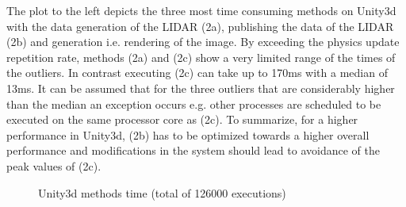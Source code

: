 	The plot to the left depicts the three most time consuming methods on Unity3d with the data generation of the \ac{LIDAR} (2a), publishing the data of the \ac{LIDAR} (2b) and generation i.e. rendering of the image. By exceeding the physics update repetition rate, methods (2a) and (2c) show a very limited range of the times of the outliers. In contrast executing (2c) can take up to 170ms with a median of 13ms. It can be assumed that for the three outliers that are considerably higher than the median an exception occurs e.g. other processes are scheduled to be executed on the same processor core as (2c). To summarize, for a higher performance in Unity3d, (2b) has to be optimized towards a higher overall performance and modifications in the system should lead to avoidance of the peak values of (2c).\\
	
	
	\begin{figure}
		\begin{center}
			\caption{Unity3d methods time (total of 126000 executions)}
			\label{fig_Unity3d1}%
		\end{center}
	\end{figure}
  
